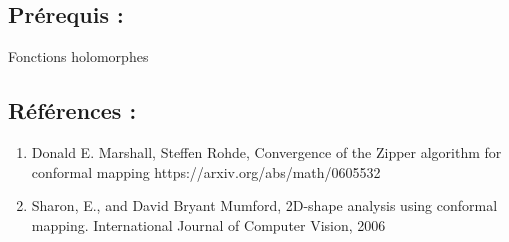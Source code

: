 \documentclass[]{article}
\begin{document}
\subsection{Prérequis :}\label{pruxe9requis}

Fonctions holomorphes

\subsection{Références :}\label{ruxe9fuxe9rences}

\begin{enumerate}
\def\labelenumi{\arabic{enumi}.}
\item
  Donald E. Marshall, Steffen Rohde, Convergence of the Zipper algorithm
  for conformal mapping https://arxiv.org/abs/math/0605532
\item
  Sharon, E., and David Bryant Mumford, 2D-shape analysis using
  conformal mapping. International Journal of Computer Vision, 2006
\end{enumerate}
\end{document}
